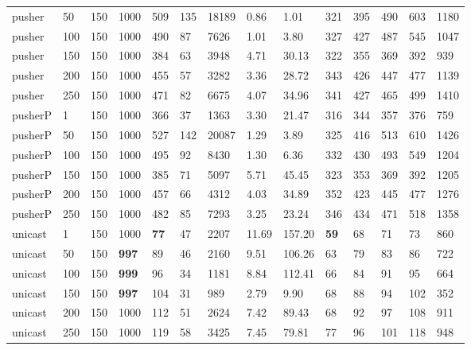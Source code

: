 \begin{table}[!htb]
\begin{tabular}{llllllllllllll}
		pusher     & 50           & 150   & 1000 & 509  & 135  & 18189    & 0.86     & 1.01     & 321 & 395  & 490  & 603  & 1180  \\
		pusher     & 100          & 150   & 1000 & 490  & 87   & 7626     & 1.01     & 3.80     & 327 & 427  & 487  & 545  & 1047  \\
		pusher     & 150          & 150   & 1000 & 384  & 63   & 3948     & 4.71     & 30.13    & 322 & 355  & 369  & 392  & 939   \\
		pusher     & 200          & 150   & 1000 & 455  & 57   & 3282     & 3.36     & 28.72    & 343 & 426  & 447  & 477  & 1139  \\
		pusher     & 250          & 150   & 1000 & 471  & 82   & 6675     & 4.07     & 34.96    & 341 & 427  & 465  & 499  & 1410  \\ \hline
		pusherP & 1            & 150   & 1000 & 366  & 37   & 1363     & 3.30     & 21.47    & 316 & 344  & 357  & 376  & 759   \\
		pusherP & 50           & 150   & 1000 & 527  & 142  & 20087    & 1.29     & 3.89     & 325 & 416  & 513  & 610  & 1426  \\
		pusherP & 100          & 150   & 1000 & 495  & 92   & 8430     & 1.30     & 6.36     & 332 & 430  & 493  & 549  & 1204  \\
		pusherP & 150          & 150   & 1000 & 385  & 71   & 5097     & 5.71     & 45.45    & 323 & 353  & 369  & 392  & 1205  \\
		pusherP & 200          & 150   & 1000 & 457  & 66   & 4312     & 4.03     & 34.89    & 352 & 423  & 445  & 477  & 1276  \\
		pusherP & 250          & 150   & 1000 & 482  & 85   & 7293     & 3.25     & 23.24    & 346 & 434  & 471  & 518  & 1358  \\ \hline
		unicast & 1            & 150   & 1000 & \textbf{77}   & 47   & 2207     & 11.69    & 157.20   & \textbf{59}  & 68   & 71   & 73   & 860   \\
		unicast & 50           & 150   & \textbf{997}  & 89   & 46   & 2160     & 9.51     & 106.26   & 63  & 79   & 83   & 86   & 722   \\
		unicast & 100          & 150   & \textbf{999}  & 96   & 34   & 1181     & 8.84     & 112.41   & 66  & 84   & 91   & 95   & 664   \\
		unicast & 150          & 150   & \textbf{997}  & 104  & 31   & 989      & 2.79     & 9.90     & 68  & 88   & 94   & 102  & 352   \\
		unicast & 200          & 150   & 1000 & 112  & 51   & 2624     & 7.42     & 89.43    & 68  & 92   & 97   & 108  & 911   \\
		unicast & 250          & 150   & 1000 & 119  & 58   & 3425     & 7.45     & 79.81    & 77  & 96   & 101  & 118  & 948  \\ \bottomrule
	\end{tabular}
\end{table}

